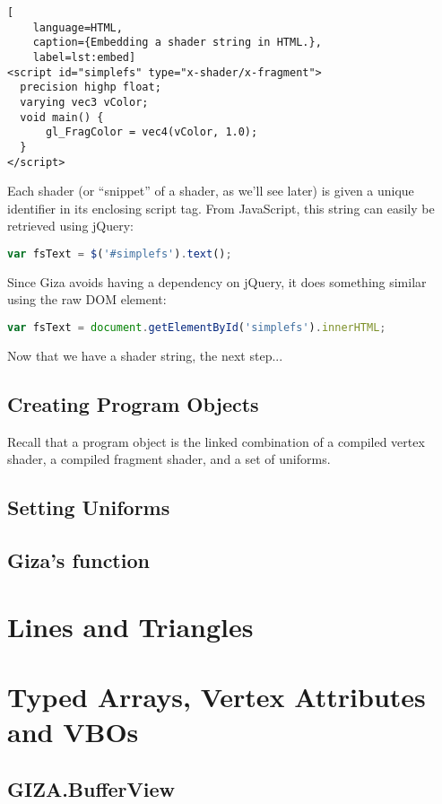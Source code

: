 \begin{lstlisting}[
    language=HTML,
    caption={Embedding a shader string in HTML.},
    label=lst:embed]
<script id="simplefs" type="x-shader/x-fragment">
  precision highp float;
  varying vec3 vColor;
  void main() {
      gl_FragColor = vec4(vColor, 1.0);
  }
</script>
\end{lstlisting}

Each shader (or ``snippet'' of a shader, as we'll see later) is given a unique identifier in its enclosing script tag.  From JavaScript, this string can easily be retrieved using jQuery:

\begin{lstlisting}[language=JavaScript]
var fsText = $('#simplefs').text();
\end{lstlisting} %

Since Giza avoids having a dependency on jQuery, it does something similar using the raw DOM element:

\begin{lstlisting}[language=JavaScript]
var fsText = document.getElementById('simplefs').innerHTML;
\end{lstlisting}

Now that we have a shader string, the next step...

\subsection{Creating Program Objects}

Recall that a  program object is the linked combination of a compiled vertex shader, a compiled fragment shader, and a set of uniforms.

\subsection{Setting Uniforms}

\subsection{Giza's  function}

\section{Lines and Triangles}

\section{Typed Arrays, Vertex Attributes and VBOs}

\subsection{GIZA.BufferView}

